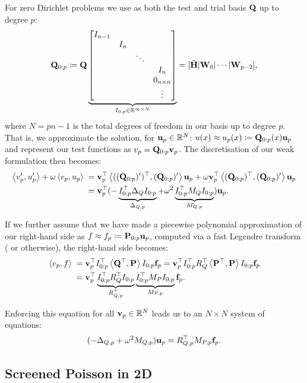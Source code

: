 \documentclass[hidelinks,onefignum,onetabnum]{siamart220329}
\makeatletter
\def\bfP{{\bf P}}
\def\bfW{{\bf W}}
\def\bfu{{\bf u}}
\def\bfv{{\bf v}}
\def\bff{{\bf f}}
\def\bfH{{\bf H}}
\def\bfQ{{\bf Q}}
\def\bfHt{\tilde\bfH}
\def\bfQuptop{\bfQ_{0:p}}
\def\bfPuptop{\bfP_{0:p}}
\def\addtab#1={#1\;&=}
\def\meeq#1{\def\ccr{\\\addtab}
 \begin{align*}
 \addtab#1
 \end{align*}
  }
\def\ip<#1>{\left\langle{#1}\right\rangle}
\def\bbR{{\mathbb R}}
\makeatother
\begin{document}
For zero Dirichlet problems we use as both the test and trial basis  $\bfQ$ up to degree $p$:
\[
	\bfQuptop \coloneqq \bfQ \underbrace{\begin{bmatrix} I_{n-1}\\ & I_n \\ && \ddots \\ &&& I_n \\ &&& 0_{n \times n} \\ &&& \vdots \end{bmatrix}}_{I_{0:p} \in \bbR^{\infty \times N}}  = [\bfHt | \bfW_0 | \cdots | \bfW_{p-2}],
\]
where $N = p  n-1$ is the total degrees of freedom in our basis up to degree $p$. That is, we approximate the solution, for $\bfu_p \in \bbR^N$:
$
u(x) \approx u_p(x) \coloneqq \bfQuptop(x) \bfu_p
$ and represent our test functions as $v_p = \bfQuptop \bfv_p$. The discretisation of our weak formulation then becomes:
\meeq{
\ip<v_p',u_p'> + \omega \ip<v_p,u_p> =  \bfv_p^\top \ip<((\bfQuptop)')^\top,(\bfQuptop)'> \bfu_p  + \omega \bfv_p^\top \ip<(\bfQuptop)^\top,(\bfQuptop)'> \bfu_p \ccr
	 = \bfv_p^\top (- \underbrace{I_{0:p}^\top\Delta_QI_{0:p}}_{\Delta_{Q,p}} +  \omega^2  \underbrace{I_{0:p}^\top M_QI_{0:p}}_{M_{Q,p}})  \bfu_p.
}
If we further assume that we have made a piecewise polynomial approximation of our right-hand side as $f \approx f_p \coloneqq \bfPuptop \bfu_p$, computed via a fast Legendre transform (\cite{townsend2018fast} or otherwise),  the right-hand side becomes:
\meeq{
	\ip<v_p,f> =\bfv_p^\top I_{0:p}^\top \ip<\bfQ^\top, \bfP> I_{0:p} \bff_p =  \bfv_p^\top I_{0:p}^\top R_Q^\top \ip<\bfP^\top, \bfP> I_{0:p} \bff_p \ccr
	= \bfv_p^\top \underbrace{I_{0:p}^\top R_Q^\top  I_{0:p}}_{R_{Q,p}^\top}  \underbrace{I_{0:p}^\top M_P  I_{0:p}}_{M_{P,p}}  \bff_p.
}
Enforcing this equation for all $\bfv_p \in \bbR^N$ leads us to an $N \times N$  system of equations:
\[
	(-\Delta_{Q,p} +  \omega^2 M_{Q,p})  \bfu_p=  R_{Q,p}^\top M_{P,p} \bff_p.
\]


\subsection{Screened Poisson in 2D}
\label{sec:helmholtz-2d}
\end{document}
